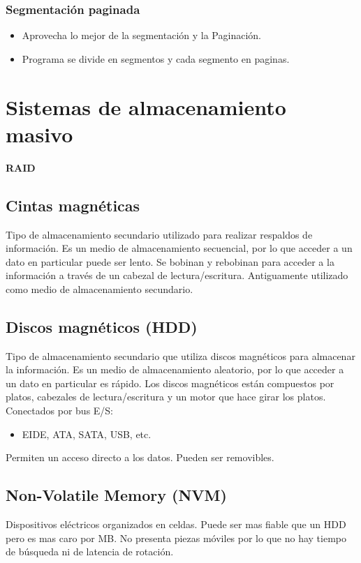 \documentclass{templateNote}
\begin{document}
\subsubsection*{Segmentación paginada}
\begin{itemize}
    \item Aprovecha lo mejor de la segmentación y la Paginación.
    \item Programa se divide en segmentos y cada segmento en paginas.
\end{itemize}


\section{Sistemas de almacenamiento masivo}

\textbf{RAID}

\subsection*{Cintas magnéticas}
Tipo de almacenamiento secundario utilizado para realizar respaldos de información. Es un medio de almacenamiento secuencial, por lo que acceder a un dato en particular puede ser lento.
Se bobinan y rebobinan para acceder a la información a través de un cabezal de lectura/escritura.
Antiguamente utilizado como medio de almacenamiento secundario.

\subsection*{Discos magnéticos (HDD)}
Tipo de almacenamiento secundario que utiliza discos magnéticos para almacenar la información. Es un medio de almacenamiento aleatorio, por lo que acceder a un dato en particular es rápido.
Los discos magnéticos están compuestos por platos, cabezales de lectura/escritura y un motor que hace girar los platos.
Conectados por bus E/S:
\begin{itemize}
    \item EIDE, ATA, SATA, USB, etc.
\end{itemize}
Permiten un acceso directo a los datos. 
Pueden ser removibles.

\subsection*{Non-Volatile Memory (NVM)}
Dispositivos eléctricos organizados en celdas. Puede ser mas fiable que un HDD pero es mas caro por MB.
No presenta piezas móviles por lo que no hay tiempo de búsqueda ni de latencia de rotación.
\end{document}
